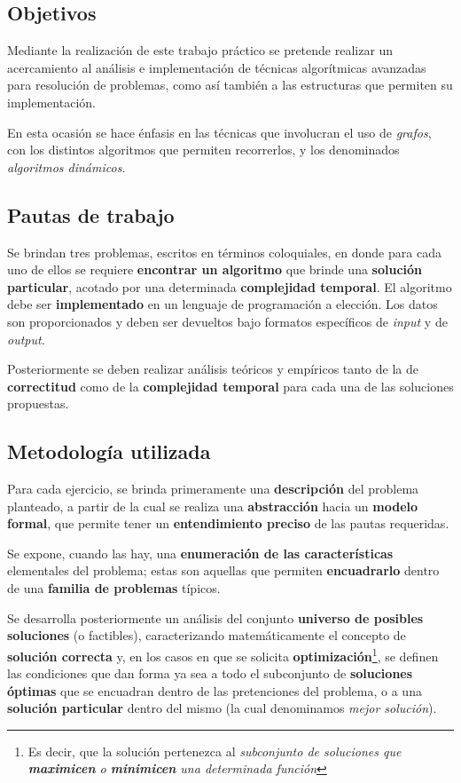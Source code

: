 \documentclass[11pt, a4paper, twoside]{article}
\begin{document}
{}

\subsection{Objetivos}
Mediante la realización de este trabajo práctico se pretende realizar un acercamiento al análisis e implementación de técnicas algorítmicas avanzadas para resolución de problemas, como así también a las estructuras que permiten su implementación. 

En esta ocasión se hace énfasis en las técnicas que involucran el uso de \emph{grafos}, con los distintos algoritmos que permiten recorrerlos, y los denominados \textit{algoritmos dinámicos}.

\subsection{Pautas de trabajo}
Se brindan tres problemas, escritos en términos coloquiales, en donde para cada uno de ellos se requiere \textbf{encontrar un algoritmo} que brinde una \textbf{solución particular}, acotado por una determinada \textbf{complejidad temporal}. El algoritmo debe ser \textbf{implementado} en un lenguaje de programación a elección. Los datos son proporcionados y deben ser devueltos bajo formatos específicos de \textit{input} y de \textit{output}.

Posteriormente se deben realizar análisis teóricos y empíricos tanto de la de \textbf{correctitud} como de la \textbf{complejidad temporal} para cada una de las soluciones propuestas.

\subsection{Metodología utilizada}
Para cada ejercicio, se brinda primeramente una \textbf{descripción} del problema planteado, a partir de la cual se realiza una \textbf{abstracción} hacia un \textbf{modelo formal}, que permite tener un \textbf{entendimiento preciso} de las pautas requeridas. 

Se expone, cuando las hay, una \textbf{enumeración de las características} elementales del problema; estas son aquellas que permiten \textbf{encuadrarlo} dentro de una \textbf{familia de problemas} típicos.

Se desarrolla posteriormente un análisis del conjunto \textbf{universo de posibles soluciones} (o factibles), caracterizando matemáticamente el concepto de \textbf{solución correcta} y, en los casos en que se solicita \textbf{optimización}\footnote{Es decir, que la solución pertenezca al \textit{subconjunto de soluciones que \textbf{maximicen} o \textbf{minimicen} una determinada función}}, se definen las condiciones que dan forma ya sea a todo el subconjunto de \textbf{soluciones óptimas} que se encuadran dentro de las pretenciones del problema, o a una \textbf{solución particular} dentro del mismo (la cual denominamos \textit{mejor solución}).
\end{document}
